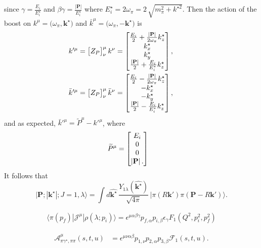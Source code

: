 {\ab
since $\gamma = \frac{E_i}{ E_i^\star}$ and $\beta \gamma = \frac{|\textbf{P}|}{E_i^\star}$ where $E_i^\star=2\omega_\pi = 2\,\sqrt{m_\pi^2 + k^{\star 2}}$. Then the action of the boost on $k^\mu = \big(\omega_\pi, \textbf{k}^\star\big)$ and ${\bar{k}^\mu = \big(\omega_\pi , -\textbf{k}^\star \big)}$ is
\begin{align}
k'^\mu &= \big[ Z_P \big]^\mu_\nu \, k^\nu = 
	\begin{bmatrix} \tfrac{E_i}{2} + \tfrac{|\textbf{P}|}{2\omega_\pi} k^\star_z \\ k^\star_x \\ k^\star_y \\ \tfrac{|\textbf{P}|}{2} + \tfrac{E_i}{E_i^\star} k^\star_z \end{bmatrix},
	\quad \quad\quad\nonumber\\
\bar{k}'^\mu &= \big[ Z_P \big]^\mu_\nu \, \bar{k}^\nu = 
	\begin{bmatrix} \tfrac{E_i}{2} - \tfrac{|\textbf{P}|}{2\omega_\pi} k^\star_z \\ -k^\star_x \\ -k^\star_y \\ \tfrac{|\textbf{P}|}{2} - \tfrac{E_i}{E_i^\star} k^\star_z \end{bmatrix},	
\end{align}
and as expected, $\bar{k}'^\mu = \widetilde{P}^\mu - k'^\mu$, where
\begin{align}
\widetilde{P}^\mu&=\begin{bmatrix}
E_i\\
0\\
0\\
|{\bf P}|\, .
\end{bmatrix}
\end{align}
It follows that 
\begin{equation}
\big| \textbf{P}; |\textbf{k}^\star|; J=1, \lambda \big\rangle = \int \! d\hat{\mathbf{k}^\star} \, \frac{Y_{1\lambda}(\hat{\mathbf{k}^\star})}{\sqrt{4\pi}}\, \big| \pi(R\textbf{k}') \pi( \textbf{P} - R\textbf{k}') \big\rangle.
\end{equation}


\begin{align}
\langle \pi(p_f)|\mathcal{J}^\mu|\rho(\lambda; p_i)\rangle
=
\epsilon^{\mu\alpha\beta\gamma}p_{f,\alpha}p_{i,\beta}\epsilon_\gamma F_1(Q^2,p_i^2,p_f^2)
\label{eq:pi_to_rho_FF}
\end{align}

\begin{align}
\mathcal{A}^{\mu}_{\pi\gamma^\star,\pi\pi}(s,t,u)&=
\epsilon^{\mu\nu\alpha\beta}p_{1,\nu}p_{2,\alpha}p_{3,\beta}\mathcal{F}_{1}(s,t,u).
\label{eq:pi_to_pipi}
\end{align}

}
